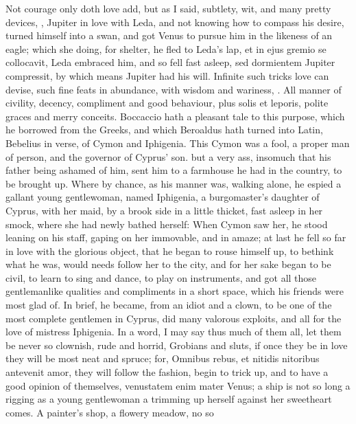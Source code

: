 Not courage only doth love add, but as I said, subtlety, wit, and many
pretty devices, ,
Jupiter in love with Leda, and not knowing how to compass his
desire, turned himself into a swan, and got Venus to pursue him in the
likeness of an eagle; which she doing, for shelter, he fled to Leda's
lap, et in ejus gremio se collocavit, Leda embraced him, and so fell
fast asleep, sed dormientem Jupiter compressit, by which means Jupiter
had his will. Infinite such tricks love can devise, such fine feats in
abundance, with wisdom and wariness, .
All manner of civility, decency, compliment and good behaviour, plus
solis et leporis, polite graces and merry conceits. Boccaccio hath a
pleasant tale to this purpose, which he borrowed from the Greeks, and
which Beroaldus hath turned into Latin, Bebelius in verse, of Cymon and
Iphigenia. This Cymon was a fool, a proper man of person, and the
governor of Cyprus' son. but a very ass, insomuch that his father being
ashamed of him, sent him to a farmhouse he had in the country, to be
brought up. Where by chance, as his manner was, walking alone, he
espied a gallant young gentlewoman, named Iphigenia, a burgomaster's
daughter of Cyprus, with her maid, by a brook side in a little thicket,
fast asleep in her smock, where she had newly bathed herself: When
Cymon saw her, he stood leaning on his staff, gaping on her
immovable, and in amaze; at last he fell so far in love with the
glorious object, that he began to rouse himself up, to bethink what he
was, would needs follow her to the city, and for her sake began to be
civil, to learn to sing and dance, to play on instruments, and got all
those gentlemanlike qualities and compliments in a short space, which
his friends were most glad of. In brief, he became, from an idiot and a
clown, to be one of the most complete gentlemen in Cyprus, did many
valorous exploits, and all for the love of mistress Iphigenia. In a
word, I may say thus much of them all, let them be never so clownish,
rude and horrid, Grobians and sluts, if once they be in love they will
be most neat and spruce; for, Omnibus rebus, et nitidis nitoribus
antevenit amor, they will follow the fashion, begin to trick up, and to
have a good opinion of themselves, venustatem enim mater Venus; a ship
is not so long a rigging as a young gentlewoman a trimming up herself
against her sweetheart comes. A painter's shop, a flowery meadow, no so
